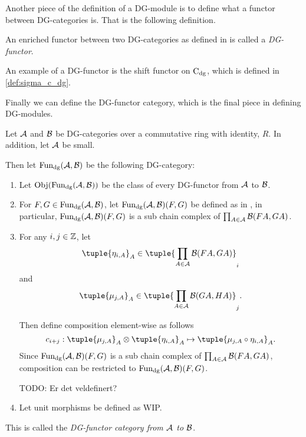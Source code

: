 Another piece of the definition of a DG-module is to define what a functor between DG-categories is. That is the following definition.

\begin{definition}[DG-functor]
    An enriched functor between two DG-categories as defined in \cite[Definition 6.2.3]{Borceux_1994} is called a \emph{DG-functor}.
\end{definition}

An example of a DG-functor is the shift functor on \( \operatorname{C}_{\operatorname{dg}} \), which is defined in \autoref{def:sigma_c_dg}.

Finally we can define the DG-functor category, which is the final piece in defining DG-modules.

\begin{definition}
    \label{def:dg_functor_category}
    Let \( {\mathcal{A}} \) and \( {\mathcal{B}} \) be DG-categories over a commutative ring with identity, \( R \). In addition, let \( {\mathcal{A}} \) be small.

    Then let \( \operatorname{Fun}_{\operatorname{dg}}({\mathcal{A}}, {\mathcal{B}}) \) be the following DG-category:
    \begin{enumerate}
        \item{
            Let \( \operatorname{Obj}(\operatorname{Fun}_{\operatorname{dg}}({\mathcal{A}}, {\mathcal{B}})) \) be the class of every DG-functor from \( {\mathcal{A}} \) to \( {\mathcal{B}} \).
        }
        \item{
            For \( F, G \in \operatorname{Fun}_{\operatorname{dg}}({\mathcal{A}}, {\mathcal{B}}) \), let \( \operatorname{Fun}_{\operatorname{dg}}({\mathcal{A}}, {\mathcal{B}})(F, G) \) be defined as in \cite[Proposition 6.3.1]{Borceux_1994}, in particular, \( \operatorname{Fun}_{\operatorname{dg}}({\mathcal{A}}, {\mathcal{B}})(F, G) \) is a sub chain complex of \( \prod_{A \in {\mathcal{A}}} {\mathcal{B}}(FA, GA) \).
        }
        \item {
            For any \( i, j \in {\mathbb{Z}} \), let
            \[
                \tuple{\eta_{i, A}}_A \in \tuple{\prod_{A \in \Ac} \Bc(FA, GA)}_i
            \]
            and
            \[
                \tuple{\mu_{j, A}}_A \in \tuple{\prod_{A \in \Ac} \Bc(GA, HA)}_j.
            \]

            Then define composition element-wise as follows
            \[
                c_{i + j}: \tuple{\mu_{j, A}}_A \otimes \tuple{\eta_{i, A}}_A \mapsto \tuple{\mu_{j, A} \circ \eta_{i, A}}_A.
            \]
            Since \( \operatorname{Fun}_{\operatorname{dg}}({\mathcal{A}}, {\mathcal{B}})(F, G) \) is a sub chain complex of \( \prod_{A \in {\mathcal{A}}} {\mathcal{B}}(FA, GA) \), composition can be restricted to \( \operatorname{Fun}_{\operatorname{dg}}({\mathcal{A}}, {\mathcal{B}})(F, G) \).

            TODO: Er det veldefinert?
        }
        \item {
            Let unit morphisms be defined as WIP.
        }
    \end{enumerate}
    This is called the \emph{DG-functor category from \( {\mathcal{A}} \) to \( {\mathcal{B}} \)}.
\end{definition}

